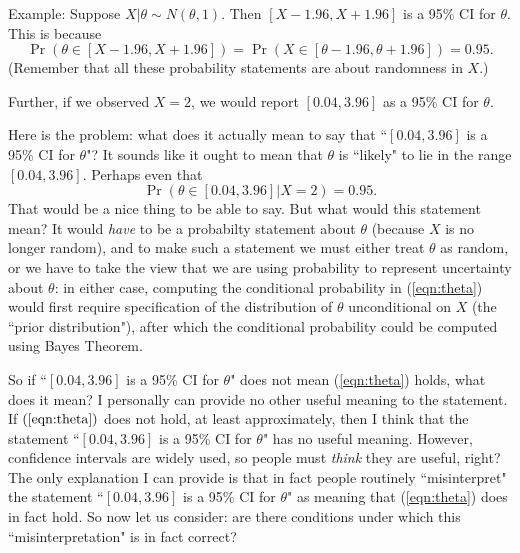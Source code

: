 \documentclass[times,11pt]{article}
\begin{document}
Example: Suppose $X | \theta \sim N(\theta,1)$. Then
$[X-1.96, X+1.96]$ is a 95\% CI for $\theta$. This is because
$$\Pr(\theta \in [X-1.96, X+1.96]) = \Pr(X \in [\theta-1.96,\theta+1.96]) = 0.95.$$
(Remember that all these probability statements are about randomness in $X$.)

Further, if we observed $X=2$, we would report $[0.04,3.96]$ as a 95\% CI for $\theta$.

Here is the problem: what does it actually mean to say that ``$[0.04,3.96]$ is a 95\% CI for $\theta$"?
It sounds like it ought to mean that $\theta$ is ``likely" to lie in the range $[0.04,3.96]$.
Perhaps even that 
\begin{equation} \label{eqn:theta}
\Pr(\theta \in [0.04,3.96] | X=2) = 0.95.
\end{equation}
That would be a nice thing to be able to say. But what would this statement mean?
It would {\it have} to be a probabilty statement about $\theta$ (because $X$ is no longer random), and to make such
a statement we must either treat $\theta$ as random,
or we have to take the view that we are using probability to represent uncertainty about $\theta$: 
in either case, computing the conditional probability in (\ref{eqn:theta}) 
would first require specification of the distribution of $\theta$ unconditional on $X$ (the ``prior distribution"),
after which the conditional probability could be computed using Bayes Theorem.


So if  ``$[0.04,3.96]$ is a 95\% CI for $\theta$" does not mean (\ref{eqn:theta}) holds, what does it mean?
I personally can provide no other useful meaning to the statement. If $(\ref{eqn:theta})$ does not
hold, at least approximately, then I think that the statement ``$[0.04,3.96]$ is a 95\% CI for $\theta$" has no useful meaning.
However, confidence intervals are widely used, so people
must {\it think} they are useful, right? The only explanation I can provide is that in fact people routinely ``misinterpret" the statement
``$[0.04,3.96]$ is a 95\% CI for $\theta$" as meaning that (\ref{eqn:theta}) does in fact hold.
So now let us consider: are there conditions under which this ``misinterpretation" is in fact correct?


\end{document}
